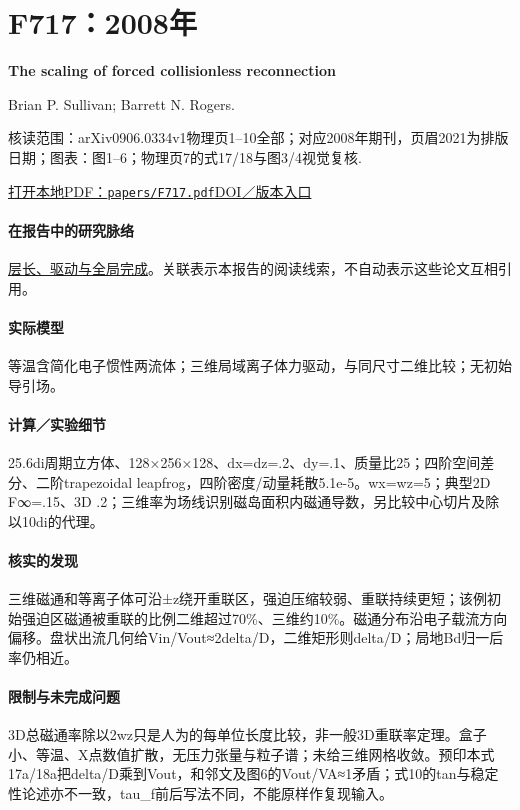 \section{F717：2008年}\label{paper:F717}

\textbf{The scaling of forced collisionless reconnection}\citep{F717}\

Brian P. Sullivan;  Barrett N. Rogers.

\textsf{核读范围：}arXiv0906.0334v1物理页1–10全部；对应2008年期刊，页眉2021为排版日期；\textsf{图表：}图1–6；物理页7的式17/18与图3/4视觉复核.

\href{run:papers/F717.pdf}{打开本地PDF：\texttt{papers/F717.pdf}}\quad\href{https://doi.org/10.1063/1.2992136}{DOI／版本入口}

\paragraph{在报告中的研究脉络}\hyperref[story:global]{层长、驱动与全局完成}。关联表示本报告的阅读线索，不自动表示这些论文互相引用。

\paragraph{实际模型}等温含简化电子惯性两流体；三维局域离子体力驱动，与同尺寸二维比较；无初始导引场。

\paragraph{计算／实验细节}25.6di周期立方体、128×256×128、dx=dz=.2、dy=.1、质量比25；四阶空间差分、二阶trapezoidal leapfrog，四阶密度/动量耗散5.1e-5。wx=wz=5；典型2D F∞=.15、3D .2；三维率为场线识别磁岛面积内磁通导数，另比较中心切片及除以10di的代理。

\paragraph{核实的发现}三维磁通和等离子体可沿±z绕开重联区，强迫压缩较弱、重联持续更短；该例初始强迫区磁通被重联的比例二维超过70\%、三维约10\%。磁通分布沿电子载流方向偏移。盘状出流几何给Vin/Vout≈2delta/D，二维矩形则delta/D；局地Bd归一后率仍相近。

\paragraph{限制与未完成问题}3D总磁通率除以2wz只是人为的每单位长度比较，非一般3D重联率定理。盒子小、等温、X点数值扩散，无压力张量与粒子谱；未给三维网格收敛。预印本式17a/18a把delta/D乘到Vout，和邻文及图6的Vout/VA≈1矛盾；式10的tan与稳定性论述亦不一致，tau\_f前后写法不同，不能原样作复现输入。

